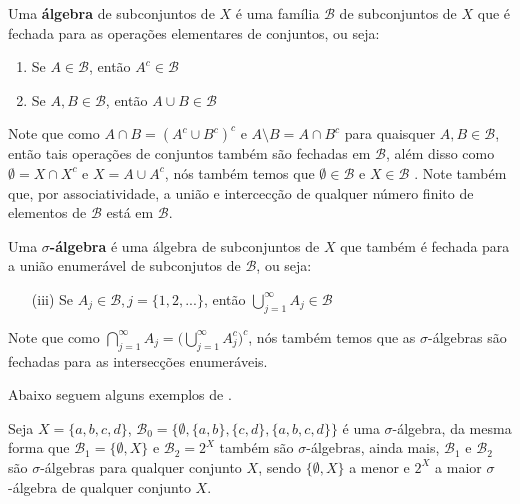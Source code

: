 

\begin{definicao} \label{def1.1}
    
    Uma \textbf{álgebra} de subconjuntos de $X$ é uma família $\mathcal{B}$ de subconjuntos de $X$
    que é fechada para as operações elementares de conjuntos, ou seja: 
    
    \begin{enumerate}[label=(\roman*)]
        \item   Se $A \in \mathcal{B}$, então $A^c \in \mathcal{B}$
        \item Se $A, B \in \mathcal{B}$, então $A \cup B \in \mathcal{B}$
    \end{enumerate} 

    Note que como $ A \cap B = (A^c \cup B^c)^c $ e $A \setminus B = A \cap B^c$ para 
    quaisquer $A,B \in \mathcal{B}$, então tais operações de conjuntos também são fechadas 
    em $\mathcal{B}$, além disso como $\emptyset = X \cap X^c $ e $X = A \cup A^c$, nós também temos 
    que $\emptyset \in \mathcal{B}  $ e $ X \in \mathcal{B}$ .  
    Note também que, por associatividade, a união e intercecção de qualquer
    número finito de elementos de $\mathcal{B}$ está em $\mathcal{B}$.                                

\end{definicao}

\begin{definicao} \label{def1.2}
    
    Uma \textbf{$\sigma$-álgebra} é uma álgebra de subconjuntos de $X$ que também é fechada para a 
    união enumerável de subconjutos de $\mathcal{B}$, ou seja:

    \begin{enumerate}
        \item[(iii)] Se $ A_j \in \mathcal{B}, j = \{ 1,2,... \}$, então $ \bigcup\limits _{j=1} ^{\infty} A_j \in 
        \mathcal{B} $ 
    \end{enumerate}

    Note que como \( \bigcap _{j=1} ^{\infty} A_j = \big( \bigcup _{j=1} ^{\infty} A_j ^c \big) ^c  \), nós também temos que as $\sigma$-álgebras são fechadas 
    para as intersecções enumeráveis.

\end{definicao}

Abaixo seguem alguns exemplos de \sig .

\begin{exemplo} \label{ex1.1}
    
    Seja \(X=\{ a,b,c,d \} \),  $ \mathcal{B}_0 = \{ \emptyset, \{a,b\},\{c,d\}, \{a,b,c,d\} \}$
    é uma $\sigma$-álgebra, da mesma forma que $\mathcal{B}_1 = \{ \emptyset, X \} $ e 
    $\mathcal{B}_2 = 2^X $ também são $\sigma$-álgebras, ainda mais, $\mathcal{B}_1$ e 
    $\mathcal{B}_2$ são $\sigma$-álgebras para qualquer conjunto $X$, sendo $\{ \emptyset, X  \}$
    a menor e $2^X$ a maior $\sigma$-álgebra de qualquer conjunto $X$. 
\end{exemplo} 

